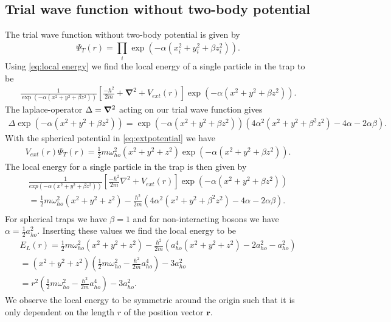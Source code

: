 \subsection{Trial wave function without two-body potential}
\label{sec:Trial wave function without two-body potential}
The trial wave function without two-body potential is given by
\begin{equation}
	\label{eq:trial wave function without two-body potential}
	\Psi_T(r) = \prod_{i}^{} \exp(-\alpha (x_i^2 + y_i^2 + \beta z_i^2)) .
\end{equation}
Using \autoref{eq:local energy} we find the local energy of a single particle in the trap to be
\begin{gather*}
	\frac{1}{\exp(-\alpha (x^2+y^2+\beta z^2))}\left[\frac{-\hbar^2}{2m} +\boldsymbol{\nabla}^2 + V _{ext}(r)\right]	\exp(-\alpha (x^2+y^2+\beta z^2)).
\end{gather*}
The laplace-operator $\Delta  = \grad^2$  acting on our trial wave function gives
\begin{gather*}
	\Delta \exp(-\alpha (x^2+y^2+\beta z^2)) = \exp(-\alpha (x^2+y^2+\beta z^2)) \left(4\alpha^2 (x^2+y^2+\beta^2 z^2) - 4 \alpha -2\alpha \beta \right).
\end{gather*}
With the spherical potential in \autoref{eq:extpotential} we have
\begin{gather*}
	V _{ext}(r) \Psi _T(r) = \frac{1}{2}m \omega _{ho}^2(x^2+y^2+z^2) \exp(-\alpha (x^2+y^2+\beta z^2)).
\end{gather*}
The local energy for a single particle in the trap is then given by
\begin{gather*}
	\frac{1}{exp(-\alpha (x^2+y^2+\beta z^2))}\left[\frac{-\hbar^2}{2m} \nabla^2 + V _{ext}(r)\right]	\exp(-\alpha (x^2+y^2+\beta z^2)) \\
	= \frac{1}{2}m \omega _{ho}^2(x^2+y^2+z^2) - \frac{\hbar ^2}{2m} \left(4\alpha^2 (x^2+y^2+\beta^2 z^2) - 4 \alpha -2\alpha \beta \right).\\
\end{gather*}
For spherical traps we have $\beta = 1$ and for non-interacting bosons we have $\alpha =\frac{1}{2}a ^2 _{ho}$. Inserting
these values we find the local energy to be
\begin{gather*}
	E_L(r) = \frac{1}{2}m \omega _{ho}^2(x^2+y^2+z^2) - \frac{\hbar ^2}{2m} \left(a _{ho}^4 (x^2+y^2+z^2) - 2 a^2 _{ho} -a^2 _{ho} \right) \\
	= (x^2+y^2+z^2)\left(\frac{1}{2}m\omega _{ho}^2-\frac{\hbar ^2}{2m}a^4 _{ho}\right)-3a^2 _{ho} \\
	= r^2 \left(\frac{1}{2}m\omega _{ho}^2-\frac{\hbar ^2}{2m}a^4 _{ho}\right)-3a^2 _{ho}.
\end{gather*}
We observe the local energy to be symmetric around the origin such that it is only dependent on the
length $r$ of the position vector $\boldsymbol{r}$.


